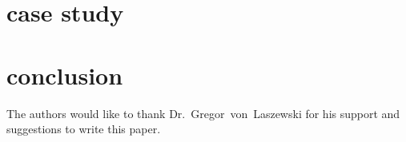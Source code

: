 \section{case study} %
\section{conclusion}

\begin{acks}

  The authors would like to thank Dr.~Gregor~von~Laszewski for his
  support and suggestions to write this paper.

\end{acks}






 

